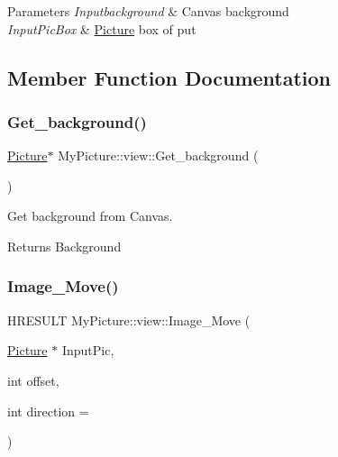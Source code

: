 \begin{DoxyParams}{Parameters}
{\em Inputbackground} & Canvas background \\
\hline
{\em Input\+Pic\+Box} & \hyperlink{class_my_picture_1_1_picture}{Picture} box of put \\
\hline
\end{DoxyParams}


\subsection{Member Function Documentation}
\mbox{\label{class_my_picture_1_1view_a64a48e69a874d48cde28c7f28334f8d7}} 
\subsubsection{\texorpdfstring{Get\+\_\+background()}{Get\_background()}}
{\footnotesize\ttfamily \hyperlink{class_my_picture_1_1_picture}{Picture}$\ast$ My\+Picture\+::view\+::\+Get\+\_\+background (\begin{DoxyParamCaption}{ }\end{DoxyParamCaption})\hspace{0.3cm}{\ttfamily [inline]}}



Get background from Canvas. 

\begin{DoxyReturn}{Returns}
Background 
\end{DoxyReturn}
\mbox{\label{class_my_picture_1_1view_ac7a95d5487774a020d48e6abe2af8df6}} 
\subsubsection{\texorpdfstring{Image\+\_\+\+Move()}{Image\_Move()}}
{\footnotesize\ttfamily H\+R\+E\+S\+U\+LT My\+Picture\+::view\+::\+Image\+\_\+\+Move (\begin{DoxyParamCaption}\item[{\hyperlink{class_my_picture_1_1_picture}{Picture} $\ast$}]{Input\+Pic,  }\item[{int}]{offset,  }\item[{int}]{direction = {} }\end{DoxyParamCaption})\hspace{0.3cm}{\ttfamily [inline]}}



